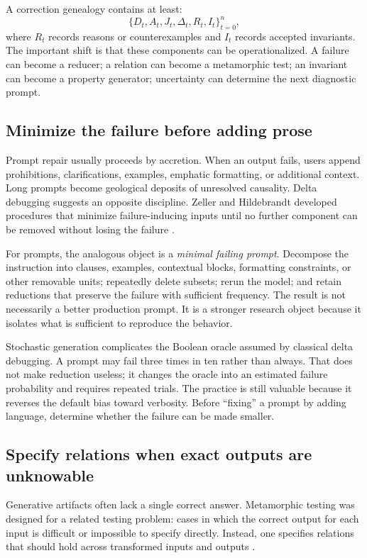 \documentclass[11pt]{article}
\begin{document}
A correction genealogy contains at least:
\[
\{D_t, A_t, J_t, \Delta_t, R_t, I_t\}_{t=0}^{n},
\]
where $R_t$ records reasons or counterexamples and $I_t$ records accepted invariants. The important shift is that these components can be operationalized. A failure can become a reducer; a relation can become a metamorphic test; an invariant can become a property generator; uncertainty can determine the next diagnostic prompt.

\subsection{Minimize the failure before adding prose}

Prompt repair usually proceeds by accretion. When an output fails, users append prohibitions, clarifications, examples, emphatic formatting, or additional context. Long prompts become geological deposits of unresolved causality. Delta debugging suggests an opposite discipline. Zeller and Hildebrandt developed procedures that minimize failure-inducing inputs until no further component can be removed without losing the failure \cite{zeller2002simplifying}.

For prompts, the analogous object is a \emph{minimal failing prompt}. Decompose the instruction into clauses, examples, contextual blocks, formatting constraints, or other removable units; repeatedly delete subsets; rerun the model; and retain reductions that preserve the failure with sufficient frequency. The result is not necessarily a better production prompt. It is a stronger research object because it isolates what is sufficient to reproduce the behavior.

Stochastic generation complicates the Boolean oracle assumed by classical delta debugging. A prompt may fail three times in ten rather than always. That does not make reduction useless; it changes the oracle into an estimated failure probability and requires repeated trials. The practice is still valuable because it reverses the default bias toward verbosity. Before ``fixing'' a prompt by adding language, determine whether the failure can be made smaller.

\subsection{Specify relations when exact outputs are unknowable}

Generative artifacts often lack a single correct answer. Metamorphic testing was designed for a related testing problem: cases in which the correct output for each input is difficult or impossible to specify directly. Instead, one specifies relations that should hold across transformed inputs and outputs \cite{chen1998metamorphic}.
\end{document}
